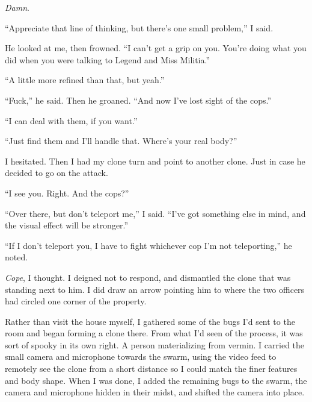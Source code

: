 \emph{Damn}.



``Appreciate that line of thinking, but there's one small problem,'' I said.



He looked at me, then frowned.  ``I can't get a grip on you.  You're doing what you did when you were talking to Legend and Miss Militia.''



``A little more refined than that, but yeah.''



``Fuck,'' he said.  Then he groaned. ``And now I've lost sight of the cops.''



``I can deal with them, if you want.''



``Just find them and I'll handle that.  Where's your real body?''



I hesitated.  Then I had my clone turn and point to another clone.  Just in case he decided to go on the attack.



``I see you.  Right.  And the cops?''



``Over there, but don't teleport me,'' I said.  ``I've got something else in mind, and the visual effect will be stronger.''



``If I don't teleport you, I have to fight whichever cop I'm not teleporting,'' he noted.



\emph{Cope}, I thought.  I deigned not to respond, and dismantled the clone that was standing next to him.  I did draw an arrow pointing him to where the two officers had circled one corner of the property.



Rather than visit the house myself, I gathered some of the bugs I'd sent to the room and began forming a clone there.  From what I'd seen of the process, it was sort of spooky in its own right.  A person materializing from vermin.  I carried the small camera and microphone towards the swarm, using the video feed to remotely see the clone from a short distance so I could match the finer features and body shape.  When I was done, I added the remaining bugs to the swarm, the camera and microphone hidden in their midst, and shifted the camera into place.



